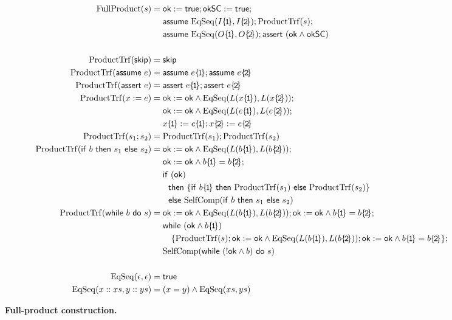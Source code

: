 \documentclass{llncs}
\newcommand{\wassign}[2]{#1 := #2}
\newcommand{\wskip}{\mathsf{skip}}
\newcommand{\wseq}[2]{{#1};{#2}}
\newcommand{\wwhile}[2]{\mathsf{while}\ {#1}\ \mathsf{do}\ {#2}}
\newcommand{\wif}[3]{\mathsf{if\ }#1\ \mathsf{then}\ #2\ \mathsf{else}\ #3}
\newcommand{\wassert}[1]{\mathsf{assert}~#1}
\newcommand{\wassume}[1]{\mathsf{assume}~#1}
\begin{document}
\newcommand{\FullProduct}[1]{\mathrm{FullProduct}(#1)}
\newcommand{\fprod}[1]{\mathrm{ProductTrf}(#1)}
\newcommand{\chkL}[1]{\wassign{\mathsf{ok}}{\mathsf{ok}\wedge \EqSeq{L(\lside{#1})}{L(\rside{#1})}}}
\newcommand{\chkT}[1]{\wassign{\mathsf{ok}}{\mathsf{ok}\wedge \lside{#1}=\rside{#1}}}

\begin{figure}[thb]
  \centering
  \begin{align*}
    \FullProduct{s} &=
     \wseq{\wassign{\ok}{\mathsf{true}}}{\wassign{\oksc}{\mathsf{true}}}; \\
    &\quad\ \wseq{\wassume{\EqSeq{\lside{I}}{\rside{I}}}}{\fprod{s}}; \\
    &\quad\ \wseq{\wassume{\EqSeq{\lside{O}}{\rside{O}}}}{\wassert{(\ok\wedge \oksc)}} \\
    & \\
    \fprod{\wskip} &=  \wskip \\
    \fprod{\wassume{e}} &=
     \wseq{\wassume{\lside{e}}}{\wassume{\rside{e}}} \\
    \fprod{\wassert{e}} &=
     \wseq{\wassert{\lside{e}}}{\wassert{\rside{e}}} \\
    \fprod{\wassign{x}{e}} &=
      \chkL{x}; \\
     &\quad\ \chkL{e};\\
     &\quad\ \wseq{\wassign{\lside{x}}{\lside{e}}}
                  {\wassign{\rside{x}}{\rside{e}}} \\
    \fprod{\wseq{s_1}{s_2}} &= 
      \wseq{\fprod{s_1}}{\fprod{s_2}} \\
    \fprod{\wif{b}{s_1}{s_2}} &=
      \chkL{b}; \\
     &\quad\ \chkT{b}; \\
     &\quad\ \mathsf{if}\ ({\mathsf{ok}}) \\
     &\qquad \mathsf{then}\ \{ {\wif{\lside{b}}{\fprod{s_1}}{\fprod{s_2}}} \}\\
     &\qquad \mathsf{else}\ \SelfComp{\wif{b}{s_1}{s_2}}\\
    \fprod{\wwhile{b}{s}} &=
      \wseq{\chkL{b}}{\chkT{b}}; \\
     &\quad\ \mathsf{while}\ (\mathsf{ok}\wedge \lside{b}) \\
     &\qquad\ \{\wseq{\fprod{s}}{\wseq{\chkL{b}}{\chkT{b}}}\}; \\
     &\quad\ \SelfComp{\wwhile{(!\ok\wedge b)}{s}} \\
    & \\
    \EqSeq{\nil}{\nil} &= \ett \\
    \EqSeq{\cons{x}{xs}}{\cons{y}{ys}} &= (x=y) \wedge \EqSeq{xs}{ys} \\
  \end{align*}
  \caption{\textbf{Full-product construction.}}
  \label{fig:fullprod}
\end{figure}
\end{document}
